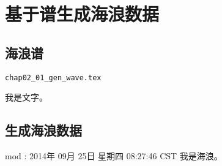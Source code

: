 \section{基于谱生成海浪数据}
\subsection{海浪谱}
\begin{verbatim}
chap02_01_gen_wave.tex
\end{verbatim}
我是文字。

\subsection{生成海浪数据}
mod : 2014年 09月 25日 星期四 08:27:46 CST
我是海浪。
